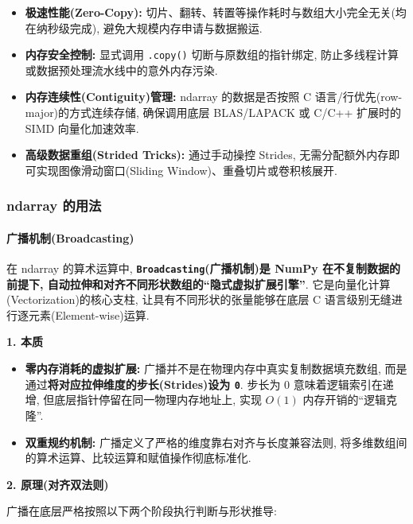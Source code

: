 \documentclass[11pt]{article}
\providecommand{\tightlist}{%
      \setlength{\itemsep}{0pt}\setlength{\parskip}{0pt}}
\begin{document}
\begin{itemize}
\tightlist
\item
  \textbf{极速性能(Zero-Copy):}
  切片、翻转、转置等操作耗时与数组大小完全无关(均在纳秒级完成),
  避免大规模内存申请与数据搬运.
\item
  \textbf{内存安全控制:} 显式调用 \texttt{.copy()}
  切断与原数组的指针绑定,
  防止多线程计算或数据预处理流水线中的意外内存污染.
\item
  \textbf{内存连续性(Contiguity)管理:} ndarray 的数据是否按照 C
  语言/行优先(row-major)的方式连续存储, 确保调用底层 BLAS/LAPACK 或
  C/C++ 扩展时的 SIMD 向量化加速效率.
\item
  \textbf{高级数据重组(Strided Tricks):} 通过手动操控 Strides,
  无需分配额外内存即可实现图像滑动窗口(Sliding
  Window)、重叠切片或卷积核展开.
\end{itemize}

    \subsubsection{ndarray 的用法}\label{ndarray-ux7684ux7528ux6cd5}

    \paragraph{广播机制(Broadcasting)}\label{ux5e7fux64adux673aux5236broadcasting}

    在 ndarray 的算术运算中, \textbf{\texttt{Broadcasting}(广播机制)是 NumPy
在不复制数据的前提下, 自动拉伸和对齐不同形状数组的``隐式虚拟扩展引擎''}.
它是向量化计算(Vectorization)的核心支柱, 让具有不同形状的张量能够在底层
C 语言级别无缝进行逐元素(Element-wise)运算.

\textbf{1. 本质}

\begin{itemize}
\tightlist
\item
  \textbf{零内存消耗的虚拟扩展:}
  广播并不是在物理内存中真实复制数据填充数组,
  而是通过\textbf{将对应拉伸维度的步长(Strides)设为 \texttt{0}}. 步长为
  0 意味着逻辑索引在递增, 但底层指针停留在同一物理内存地址上, 实现
  \(O(1)\) 内存开销的``逻辑克隆''.
\item
  \textbf{双重规约机制:} 广播定义了严格的维度靠右对齐与长度兼容法则,
  将多维数组间的算术运算、比较运算和赋值操作彻底标准化.
\end{itemize}

\textbf{2. 原理(对齐双法则)}

广播在底层严格按照以下两个阶段执行判断与形状推导:
\end{document}
